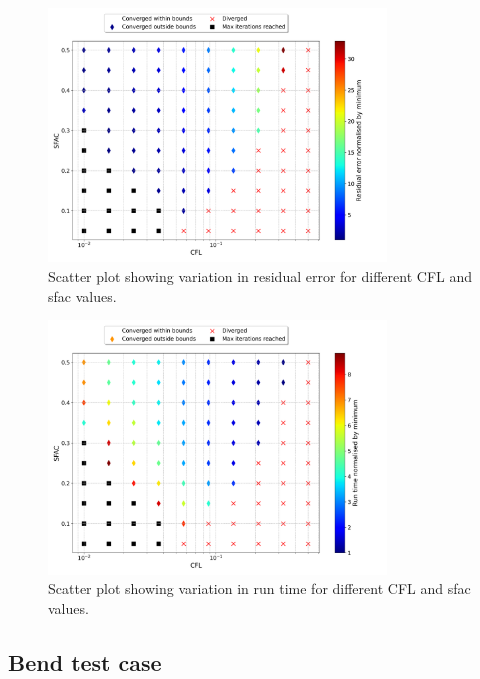 \documentclass{article}
\begin{document}
\begin{figure}
    \centering
    \includegraphics[width=0.8\textwidth]{figures/bump_cfl_sfac_residual.png}
    \caption{Scatter plot showing variation in residual error for different CFL and sfac values.}
    \label{fig:bump_cfl_sfac_residual}
\end{figure}

\begin{figure}[H]
    \centering
    \centering
    \includegraphics[width=0.8\textwidth]{figures/bump_cfl_sfac_time.png}
    \caption{Scatter plot showing variation in run time for different CFL and sfac values.}
    \label{fig:bump_cfl_sfac_time}
\end{figure}

\subsection{Bend test case}
\end{document}
